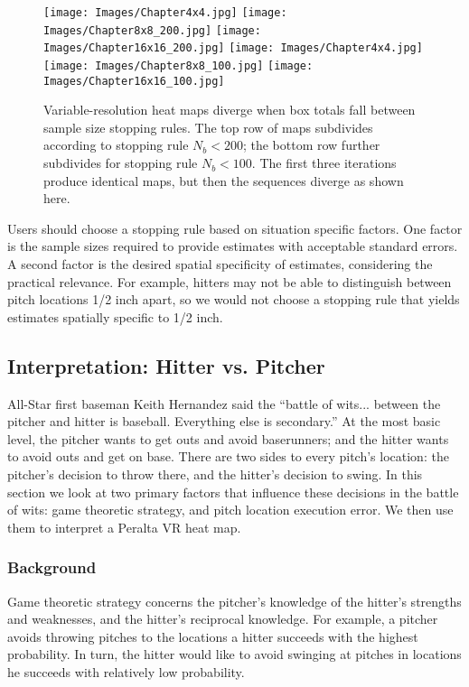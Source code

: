        \begin{figure}[H]
      	\centering      
      	\texttt{[image: Images/Chapter4x4.jpg]}
      	\texttt{[image: Images/Chapter8x8\_200.jpg]}
      	\texttt{[image: Images/Chapter16x16\_200.jpg]}
      	\texttt{[image: Images/Chapter4x4.jpg]}
      	\texttt{[image: Images/Chapter8x8\_100.jpg]}
      	\texttt{[image: Images/Chapter16x16\_100.jpg]}
      	\caption{Variable-resolution heat maps diverge when box totals fall between sample size stopping rules. The top row of maps subdivides according to stopping rule $N_{b} < 200$; the bottom row further subdivides for stopping rule $N_{b} < 100$. The first three iterations produce identical maps, but then the sequences diverge as shown here.}
      	\label{fig:vrcomp2}
\end{figure}
Users should choose a stopping rule based on situation specific factors. One factor is the sample sizes required to provide estimates with acceptable standard errors. A second factor is the desired spatial specificity of estimates, considering the practical relevance. For example, hitters may not be able to distinguish between pitch locations 1/2 inch apart, so we would not choose a stopping rule that yields estimates spatially specific to 1/2 inch.

\subsection{Interpretation: Hitter vs. Pitcher} %

All-Star first baseman Keith Hernandez said the ``battle of wits... between the pitcher and hitter is baseball. Everything else is secondary.'' At the most basic level, the pitcher wants to get outs and avoid baserunners; and the hitter wants to avoid outs and get on base. There are two sides to every pitch's location: the pitcher's decision to throw there, and the hitter's decision to swing. In this section we look at two primary factors that influence these decisions in the battle of wits: game theoretic strategy, and pitch location execution error. We then use them to interpret a Peralta VR heat map.

\subsubsection*{Background}

Game theoretic strategy concerns the pitcher's knowledge of the hitter's strengths and weaknesses, and the hitter's reciprocal knowledge. For example, a pitcher avoids throwing pitches to the locations a hitter succeeds with the highest probability. In turn, the hitter would like to avoid swinging at pitches in locations he succeeds with relatively low probability.

